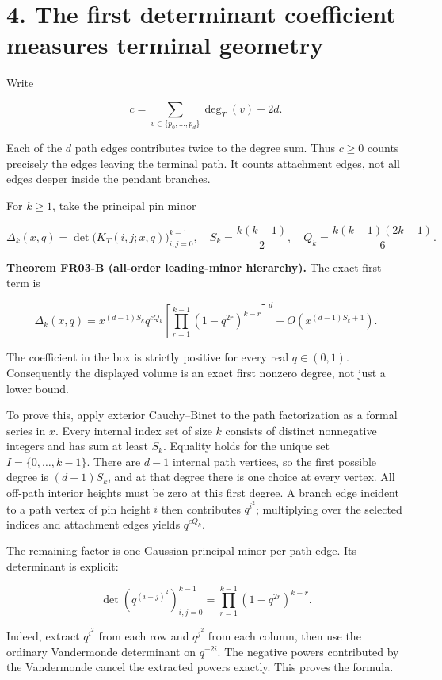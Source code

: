 \documentclass[
  11pt,
  a4paper,
]{report}
\begin{document}
\hypertarget{the-first-determinant-coefficient-measures-terminal-geometry}{%
\section{4. The first determinant coefficient measures terminal
geometry}\label{the-first-determinant-coefficient-measures-terminal-geometry}}

Write

\[
c=\sum_{v\in\{p_0,\ldots,p_d\}}\deg_T(v)-2d.
\]

Each of the \(d\) path edges contributes twice to the degree sum. Thus
\(c\ge0\) counts precisely the edges leaving the terminal path. It
counts attachment edges, not all edges deeper inside the pendant
branches.

For \(k\ge1\), take the principal pin minor

\[
\Delta_k(x,q)=\det\bigl(K_T(i,j;x,q)\bigr)_{i,j=0}^{k-1},
\quad S_k=\frac{k(k-1)}2,
\quad Q_k=\frac{k(k-1)(2k-1)}6.
\]

\textbf{Theorem FR03-B (all-order leading-minor hierarchy).} The exact
first term is

\[
\boxed{
\Delta_k(x,q)=
x^{(d-1)S_k}q^{cQ_k}
\left[\prod_{r=1}^{k-1}(1-q^{2r})^{k-r}\right]^d
+O\!\left(x^{(d-1)S_k+1}\right).
}
\]

The coefficient in the box is strictly positive for every real
\(q\in(0,1)\). Consequently the displayed volume is an exact first
nonzero degree, not just a lower bound.

To prove this, apply exterior Cauchy--Binet to the path factorization as
a formal series in \(x\). Every internal index set of size \(k\)
consists of distinct nonnegative integers and has sum at least \(S_k\).
Equality holds for the unique set \(I=\{0,\ldots,k-1\}\). There are
\(d-1\) internal path vertices, so the first possible degree is
\((d-1)S_k\), and at that degree there is one choice at every vertex.
All off-path interior heights must be zero at this first degree. A
branch edge incident to a path vertex of pin height \(i\) then
contributes \(q^{i^2}\); multiplying over the selected indices and
attachment edges yields \(q^{cQ_k}\).

The remaining factor is one Gaussian principal minor per path edge. Its
determinant is explicit:

\[
\det(q^{(i-j)^2})_{i,j=0}^{k-1}
=\prod_{r=1}^{k-1}(1-q^{2r})^{k-r}.
\]

Indeed, extract \(q^{i^2}\) from each row and \(q^{j^2}\) from each
column, then use the ordinary Vandermonde determinant on \(q^{-2i}\).
The negative powers contributed by the Vandermonde cancel the extracted
powers exactly. This proves the formula.
\end{document}
